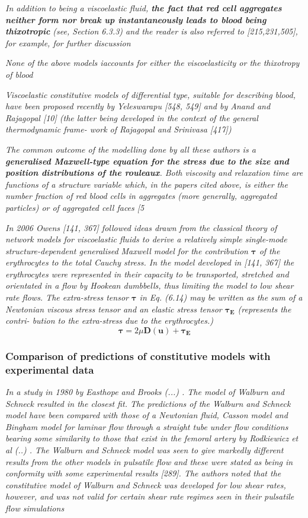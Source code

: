 \documentclass[11pt,letterpaper]{article}
\begin{document}
\textit{In addition to being a viscoelastic fluid, \textbf{the fact that red cell aggregates neither form nor break up instantaneously leads to blood being thixotropic }(see, Section 6.3.3) and the reader is also referred to [215,231,505], for example, for further discussion}


\textit{None of the above models iaccounts for either the viscoelasticity or the thixotropy of blood}



\textit{Viscoelastic constitutive models of differential type, suitable for describing blood, have been proposed recently by Yeleswarapu [548, 549] and by Anand and Rajagopal [10] (the latter being developed in the context of the general thermodynamic frame- work of Rajagopal and Srinivasa [417])}


\textit{The common outcome of the modelling done by all these authors is a \textbf{generalised Maxwell-type equation for the stress due to the size and position distributions of the rouleaux}. Both viscosity and relaxation time are functions of a structure variable which, in the papers cited above, is either the number fraction of red blood cells in aggregates (more generally, aggregated particles)  or of aggregated cell faces [5}

\textit{
In 2006 Owens [141, 367] followed ideas drawn from the classical theory
of network models for viscoelastic fluids to derive a relatively simple single-mode structure-dependent generalised Maxwell model for the contribution $\bm{\tau}$
of the erythrocytes to the total Cauchy stress. In the model developed in [141,
367] the erythrocytes were represented in their capacity to be transported,
stretched and orientated in a flow by Hookean dumbbells, thus limiting the
model to low shear rate flows. The extra-stress tensor $\bm{\tau}$ in Eq. (6.14) may be
written as the sum of a Newtonian viscous stress tensor and an elastic stress
tensor $\bm{\tau_E}$ (represents the contri- bution to the extra-stress due to the erythrocytes.) }\begin{equation}
    \bm{\tau}= 2\mu \bm{D}(\bm{u})+\bm{\tau_E}
\end{equation}

{\color{red} \subsubsection*{Comparison of predictions of constitutive models with experimental data}}
\textit{In a study in 1980 by Easthope and Brooks (...) . The model of Walburn and Schneck resulted in the closest fit. The predictions of the Walburn and Schneck model have been compared with those of a Newtonian fluid, Casson model and Bingham model for laminar flow through a straight tube under flow conditions bearing some similarity to those that exist in the femoral artery by Rodkiewicz et al (..) . The Walburn and Schneck model was seen to give markedly different results from the other models in pulsatile flow and these were stated as being in conformity with some experimental results [289]. The authors noted that the constitutive model of Walburn and Schneck was developed for low shear rates, however, and was not valid for certain shear rate regimes seen in their pulsatile flow simulations}
\end{document}
